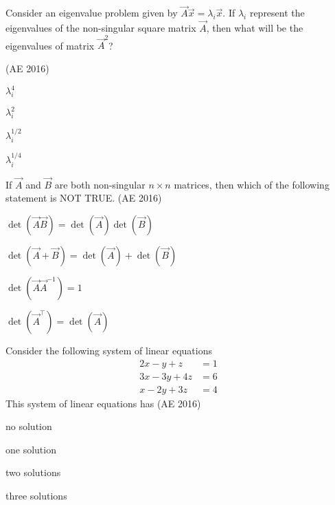     \item Consider an eigenvalue problem given by $\vec{A} \vec{x} = \lambda_i \vec{x}$.  
    If $\lambda_i$ represent the eigenvalues of the non-singular square matrix $\vec{A}$, then what will be the eigenvalues of matrix $\vec{A}^2$?  

    \hfill(AE 2016)
    \begin{enumerate}
    \begin{multicols}{2}
        \item $\lambda_i^{4}$
        \item $\lambda_i^{2}$
        \item $\lambda_i^{1/2}$
        \item $\lambda_i^{1/4}$
         \end{multicols}
    \end{enumerate}
    \item If $\vec{A}$ and $\vec{B}$ are both non-singular $n \times n$ matrices, then which of the following statement is NOT TRUE.  
    \hfill(AE 2016)
    \begin{enumerate}
    \begin{multicols}{2}
        \item $\det(\vec{A}\vec{B}) = \det(\vec{A}) \det(\vec{B})$
        \item $\det(\vec{A}+\vec{B}) = \det(\vec{A}) + \det(\vec{B})$
        \item $\det(\vec{A}\vec{A}^{-1}) = 1$
        \item $\det(\vec{A}^{\top}) = \det(\vec{A})$
        \end{multicols}
    \end{enumerate}
\item Consider the following system of linear equations
\begin{align*}
2x - y + z &= 1 \\
3x - 3y + 4z &= 6 \\
x - 2y + 3z &= 4
\end{align*}
This system of linear equations has
\hfill(AE 2016)
\begin{enumerate}
\begin{multicols}{4}
    \item no solution
    \item one solution
    \item two solutions
    \item three solutions
\end{multicols}
\end{enumerate}
